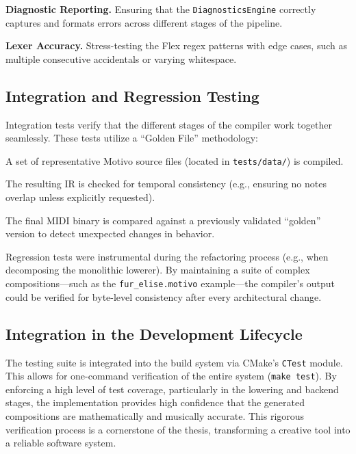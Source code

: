 \noindent \textbf{Diagnostic Reporting.} Ensuring that the \texttt{DiagnosticsEngine} correctly captures and formats
errors across different stages of the pipeline.

\noindent \textbf{Lexer Accuracy.} Stress-testing the Flex regex patterns with edge cases, such as multiple consecutive
accidentals or varying whitespace.

\subsection{Integration and Regression Testing}\label{detail-subsec:integration-and-regression-testing}

Integration tests verify that the different stages of the compiler work together seamlessly.
These tests utilize a ``Golden File'' methodology:

\noindent A set of representative Motivo source files (located in \texttt{tests/data/}) is compiled.

\noindent The resulting IR is checked for temporal consistency (e.g., ensuring no notes overlap unless explicitly
requested).

\noindent The final MIDI binary is compared against a previously validated ``golden'' version to detect
unexpected changes
in behavior.

Regression tests were instrumental during the refactoring process (e.g., when decomposing the monolithic lowerer).
By maintaining a suite of complex compositions---such as the \texttt{fur\_elise.motivo} example---the compiler's
output could be
verified for byte-level consistency after every architectural change.

\subsection{Integration in the Development Lifecycle}\label{detail-subsec:integration-in-the-development-lifecycle}

The testing suite is integrated into the build system via CMake's \texttt{CTest} module.
This allows for one-command verification of the entire system (\texttt{make test}).
By enforcing a high level of test coverage, particularly in the lowering and backend stages, the implementation provides
high confidence that the generated compositions are mathematically and musically accurate.
This rigorous verification process is a cornerstone of the thesis, transforming a creative tool into a reliable software
system.
